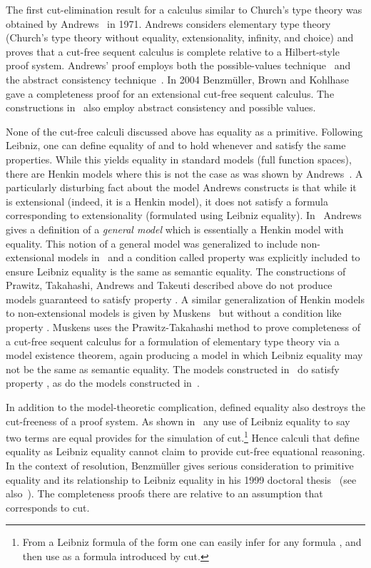 The first cut-elimination result for a calculus similar
to Church's type theory was obtained by
Andrews~\cite{Andrews71} in 1971.  Andrews considers
elementary type theory (Church's type theory without
equality, extensionality, infinity, and choice) and
proves that a cut-free sequent calculus is complete
relative to a Hilbert-style proof system.  
Andrews' proof employs both the possible-values
technique~\cite{Takahashi67,Prawitz68} and the abstract
consistency technique~\cite{SmullyanBook}.
In 2004 Benzm\"uller, Brown and Kohlhase~\cite{BBKweb04} gave
a completeness proof for an extensional cut-free sequent calculus.
The constructions in~\cite{BBKweb04} also employ abstract consistency
and possible values.

None of the cut-free calculi discussed above has
equality as a primitive.  Following Leibniz, one can
define equality of  and  to hold whenever  and
 satisfy the same properties.  While this yields
equality in standard models (full function spaces),
there are Henkin models where this is not the
case as was shown by Andrews~\cite{Andrews72a}.  
A particularly disturbing fact about the model Andrews constructs
is that while it is extensional (indeed, it is a Henkin model),
it does not satisfy a formula corresponding to extensionality
(formulated using Leibniz equality).
In~\cite{Andrews72a} Andrews gives
a definition of a {\em general model} which is essentially a Henkin model
with equality.
This notion of a general model was generalized to include non-extensional models in~\cite{BBK04}
and a condition called property 
was explicitly included to ensure Leibniz equality is the same as semantic equality.
The constructions of Prawitz, Takahashi, Andrews and Takeuti described above
do not produce models guaranteed to satisfy property .
A similar generalization of Henkin models to non-extensional models is given by Muskens~\cite{Muskens07}
but without a condition like property .  Muskens uses the Prawitz-Takahashi method
to prove completeness of a cut-free sequent calculus for a formulation of elementary type theory
via a model existence theorem, again producing a model in which Leibniz equality may not be the same as semantic equality.
The models constructed in~\cite{BBK04} do satisfy property ,
as do the models constructed in~\cite{BBKweb04}.

In addition
to the model-theoretic complication, defined equality also destroys the cut-freeness of a proof system.  As shown
in~\cite{BBK2009} any use of Leibniz equality to say
two terms are equal provides for the simulation of 
cut.\footnote{From a Leibniz formula of the form  one can easily infer  for any formula , and then use  as a formula introduced by cut.} Hence calculi that define equality as Leibniz equality
cannot claim to provide cut-free equational reasoning.
In the context of resolution,
Benzm\"uller gives serious consideration to primitive equality
and its relationship to Leibniz equality in his 1999 doctoral thesis~\cite{Benzmuller99a} (see also~\cite{Benzmuller99b}).
The completeness proofs there are relative to an assumption that corresponds to cut.


